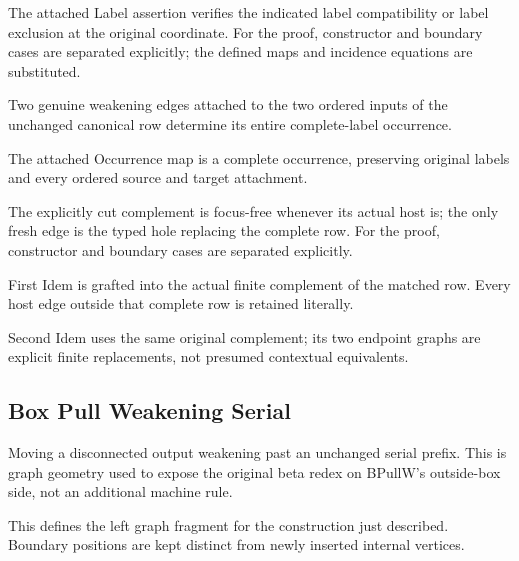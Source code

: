 The attached Label assertion verifies the indicated label compatibility or label exclusion at the original coordinate.
For the proof, constructor and boundary cases are separated explicitly; the defined maps and incidence equations are substituted.
\par{}

Two genuine weakening edges attached to the two ordered inputs of the unchanged canonical row determine its entire complete-label occurrence.
\par{}

The attached Occurrence map is a complete occurrence, preserving original labels and every ordered source and target attachment.
\par{}

The explicitly cut complement is focus-free whenever its actual host is; the only fresh edge is the typed hole replacing the complete row.
For the proof, constructor and boundary cases are separated explicitly.
\par{}

First Idem is grafted into the actual finite complement of the matched row. Every host edge outside that complete row is retained literally.
\par{}

Second Idem uses the same original complement; its two endpoint graphs are explicit finite replacements, not presumed contextual equivalents.
\par{}

\subsection{Box Pull Weakening Serial}
Moving a disconnected output weakening past an unchanged serial prefix. This is graph geometry used to expose the original beta redex on BPullW's outside-box side, not an additional machine rule.

This defines the left graph fragment for the construction just described. Boundary positions are kept distinct from newly inserted internal vertices.
\par{}

